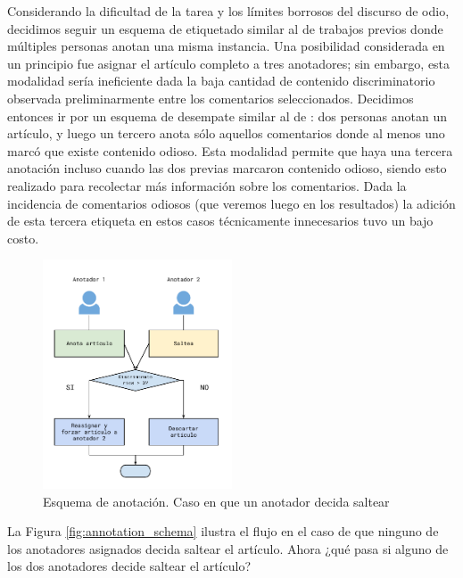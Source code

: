 Considerando la dificultad de la tarea y los límites borrosos del discurso de odio, decidimos seguir un esquema de etiquetado similar al de trabajos previos donde múltiples personas anotan una misma instancia. Una posibilidad considerada en un principio fue asignar el artículo completo a tres anotadores; sin embargo, esta modalidad sería ineficiente dada la baja cantidad de contenido discriminatorio observada preliminarmente entre los comentarios seleccionados. Decidimos entonces ir por un esquema de desempate similar al de \citet{hateval2019semeval}: dos personas anotan un artículo, y luego un tercero anota sólo aquellos comentarios donde al menos uno marcó que existe contenido odioso. Esta modalidad permite que haya una tercera anotación incluso cuando las dos previas marcaron contenido odioso, siendo esto realizado para recolectar más información sobre los comentarios. Dada la incidencia de comentarios odiosos (que veremos luego en los resultados) la adición de esta tercera etiqueta en estos casos técnicamente innecesarios tuvo un bajo costo.




\begin{figure}
    \centering
    \includegraphics[width=0.5\textwidth]{img/esquema_anotacion_caso_2.pdf}
    \caption{Esquema de anotación. Caso en que un anotador decida saltear}
    \label{fig:annotation_schema_case_two}
\end{figure}


La Figura \ref{fig:annotation_schema} ilustra el flujo en el caso de que ninguno de los anotadores asignados decida saltear el artículo. Ahora ¿qué pasa si alguno de los dos anotadores decide saltear el artículo?


